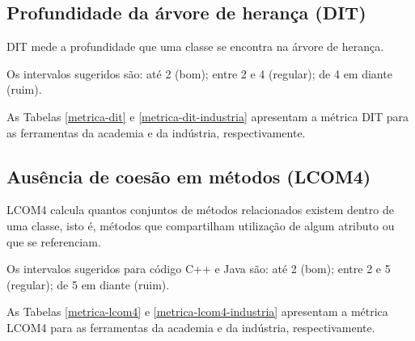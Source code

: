 \subsection{Profundidade da árvore de herança (DIT)}

DIT mede a profundidade que uma classe se encontra na árvore de herança.

Os intervalos sugeridos são: até 2 (bom); entre 2 e 4 (regular); de 4 em
diante (ruim).

As Tabelas \ref{metrica-dit} e \ref{metrica-dit-industria} apresentam a
métrica DIT para as ferramentas da academia e da indústria, respectivamente.



\subsection{Ausência de coesão em métodos (LCOM4)}

LCOM4 calcula quantos conjuntos de métodos relacionados existem dentro de uma
classe, isto é, métodos que compartilham utilização de algum atributo ou que
se referenciam.

Os intervalos sugeridos para código C++ e Java são: até 2 (bom); entre 2 e 5
(regular); de 5 em diante (ruim).

As Tabelas \ref{metrica-lcom4} e \ref{metrica-lcom4-industria} apresentam a
métrica LCOM4 para as ferramentas da academia e da indústria, respectivamente.

